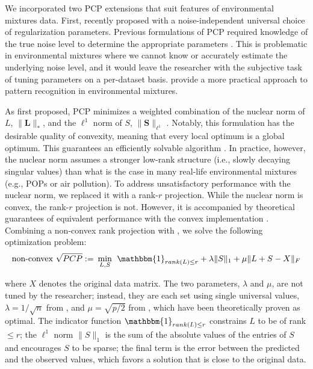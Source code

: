 We incorporated two PCP extensions that suit features of environmental mixtures data. First, \citet{cite_zhang} recently proposed \rootpcp with a noise-independent universal choice of regularization parameters. Previous formulations of PCP required knowledge of the true noise level to determine the appropriate parameters \citep{zhou2010stable, chen2015fast, chen2020bridging}. This is problematic in environmental mixtures where we cannot know or accurately estimate the underlying noise level, and it would leave the researcher with the subjective task of tuning parameters on a per-dataset basis. \citet{cite_zhang} provide a more practical approach to pattern recognition in environmental mixtures.

As first proposed, PCP minimizes a weighted combination of the nuclear norm of $L$, $\|\boldsymbol{L}\|_{*}$, and the $\ell^1$ norm of $S$, $\|\boldsymbol{S}\|_{\ell^1}$ \citep{zhou2010stable}. Notably, this formulation has the desirable quality of convexity, meaning that every local optimum is a global optimum. This guarantees an efficiently solvable algorithm \citep{boyd2004convex}. In practice, however, the nuclear norm assumes a stronger low-rank structure (i.e., slowly decaying singular values) than what is the case in many real-life environmental mixtures (e.g., POPs or air pollution). To address unsatisfactory performance with the nuclear norm, we replaced it with a rank-$r$ projection. While the nuclear norm is convex, the rank-$r$ projection is not. However, it is accompanied by theoretical guarantees of equivalent performance with the convex implementation \citep{netrapalli2014non, chen2020bridging}. Combining a non-convex rank projection with \rootpcpc, we solve the following optimization problem:
\begin{equation}\label{eqn:ncvxroot}
\text{non-convex }\sqrt{PCP} := \hspace{0.5ex} \min _{L, S} \hspace{1ex} \mathbbm{1}_{rank(L) \le r} + \lambda\|S\|_{1} + \mu\|L+S-X\|_{F}
\end{equation}

where $X$ denotes the original data matrix. The two parameters, $\lambda$ and $\mu$, are not tuned by the researcher; instead, they are each set using single universal values, $\lambda = 1/\sqrt{n}$ from \citet{candes2011robust}, and $\mu = \sqrt{p/2}$ from \citet{cite_zhang}, which have been theoretically proven as optimal. The indicator function $\mathbbm{1}_{rank(L) \le r}$ constrains $L$ to be of rank $\le r$; the $\ell^1$ norm $\|S\|_{1}$ is the sum of the absolute values of the entries of $S$ and encourages $S$ to be sparse; the final term is the error between the predicted and the observed values, which favors a solution that is close to the original data.

